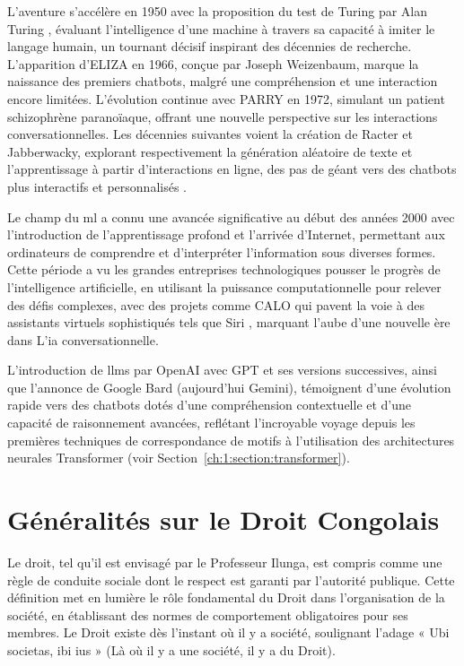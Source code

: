 L'aventure s'accélère en 1950 avec la proposition du test de Turing par Alan Turing \cite{turingTest}, évaluant l'intelligence d'une machine à travers sa capacité à imiter le langage humain, un tournant décisif inspirant des décennies de recherche. L'apparition d'ELIZA \cite{eliza1966} en 1966, conçue par Joseph Weizenbaum, marque la naissance des premiers chatbots, malgré une compréhension et une interaction encore limitées. L'évolution continue avec PARRY en 1972, simulant un patient schizophrène paranoïaque, offrant une nouvelle perspective sur les interactions conversationnelles. Les décennies suivantes voient la création de Racter et Jabberwacky, explorant respectivement la génération aléatoire de texte et l'apprentissage à partir d'interactions en ligne, des pas de géant vers des chatbots plus interactifs et personnalisés \cite{chatbotHistoryChatbots, Weizenbaum1966ELIZAaCP, alamin2024history}. 

Le champ du \ac{ml} a connu une avancée significative au début des années 2000 avec l'introduction de l'apprentissage profond et l'arrivée d'Internet, permettant aux ordinateurs de comprendre et d'interpréter l'information sous diverses formes. Cette période a vu les grandes entreprises technologiques pousser le progrès de l'intelligence artificielle, en utilisant la puissance computationnelle pour relever des défis complexes, avec des projets comme CALO qui pavent la voie à des assistants virtuels sophistiqués tels que Siri \cite{siri}, marquant l'aube d'une nouvelle ère dans L'\ac{ia} conversationnelle.

L'introduction de \acfp{llm} par OpenAI avec GPT et ses versions successives, ainsi que l'annonce de Google Bard (aujourd'hui Gemini), témoignent d'une évolution rapide vers des chatbots dotés d'une compréhension contextuelle et d'une capacité de raisonnement avancées, reflétant l'incroyable voyage depuis les premières techniques de correspondance de motifs à l'utilisation des architectures neurales Transformer (voir Section~\ref{ch:1:section:transformer}).

\newpage
\section{Généralités sur le Droit Congolais}
\label{ch:1:section:introduction-law}

Le droit, tel qu'il est envisagé par le Professeur Ilunga, est compris comme une règle de conduite sociale dont le respect est garanti par l'autorité publique. Cette définition met en lumière le rôle fondamental du Droit dans l'organisation de la société, en établissant des normes de comportement obligatoires pour ses membres. Le Droit existe dès l'instant où il y a société, soulignant l'adage « Ubi societas, ibi ius » (Là où il y a une société, il y a du Droit).

